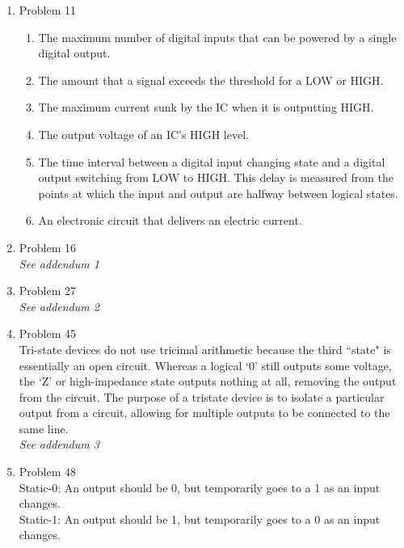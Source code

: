 \begin{enumerate}[leftmargin=2cm,labelsep=.5cm,label=\bf\arabic*.]

\item Problem 11
\begin{enumerate}
  \item The maximum number of digital inputs that can be powered by a single digital output.
  \item The amount that a signal exceeds the threshold for a LOW or HIGH. 
  \item The maximum current sunk by the IC when it is outputting HIGH.
  \item The output voltage of an IC's HIGH level.
  \item The time interval between a digital input changing state and a digital output switching from LOW to HIGH. This delay is measured from the points at which the input and output are halfway between logical states.
  \item An electronic circuit that delivers an electric current. 
\end{enumerate}

\item Problem 16 \\
\emph{See addendum 1}

\item Problem 27 \\
\emph{See addendum 2}

\item Problem 45 \\
Tri-state devices do not use tricimal arithmetic because the third ``state" is essentially an open circuit. Whereas a logical `0' still outputs some voltage, the `Z' or high-impedance state outputs nothing at all, removing the output from the circuit. The purpose of a tristate device is to isolate a particular output from a circuit, allowing for multiple outputs to be connected to the same line. \\
\emph{See addendum 3}

\item Problem 48 \\
Static-0: An output should be 0, but temporarily goes to a 1 as an input changes. \\
Static-1: An output should be 1, but temporarily goes to a 0 as an input changes.

\end{enumerate}

